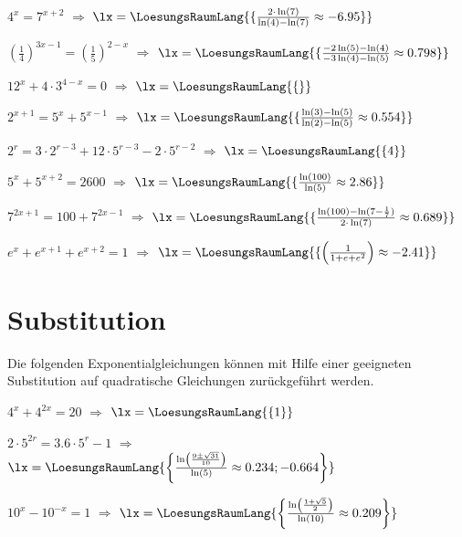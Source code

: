 \begin{bbwAufgabenBlock}
\item $4^x=7^{x+2}$ $\Longrightarrow$ $\lx=\LoesungsRaumLang{\{\frac{2\cdot{}\ln(7)}{\ln(4)-\ln(7)} \approx -6.95   \}}$ \plz{}
\item $\left(\frac14\right)^{3x-1} = \left(\frac15\right)^{2-x}$ $\Longrightarrow$ $\lx=\LoesungsRaumLang{\{\frac{-2\ln(5)-\ln(4)}{-3\ln(4)-\ln(5)} \approx 0.798   \}}$ \plz{}
\item $12^x+4\cdot{}3^{4-x}=0$ $\Longrightarrow$
$\lx=\LoesungsRaumLang{\{   \}}$  \plz{} \noTRAINER{\newpage}
\item $2^{x+1}=5^x + 5^{x-1}$ $\Longrightarrow$ $\lx=\LoesungsRaumLang{\{\frac{\ln(3)-\ln(5)}{\ln(2)-\ln(5)} \approx 0.554   \}}$ \plz{}
\item $2^r=3\cdot{}2^{r-3} + 12\cdot{}5^{r-3} - 2\cdot{}5^{r-2}$ $\Longrightarrow$ $\lx=\LoesungsRaumLang{\{ 4 \}}$ \plz{}
\item $5^x + 5^{x+2} = 2600$ $\Longrightarrow$ $\lx=\LoesungsRaumLang{\{\frac{\ln(100)}{\ln(5)} \approx 2.86   \}}$ \plz{}
\item $7^{2x+1} = 100 + 7^{2x-1}$ $\Longrightarrow$ $\lx=\LoesungsRaumLang{\{\frac{\ln(100) - \ln(7-\frac17)}{2\cdot{}\ln(7)} \approx  0.689  \}}$ \plz{}\noTRAINER{\newpage}
\item $e^x + e^{x+1} + e^{x+2} = 1$ $\Longrightarrow$ $\lx=\LoesungsRaumLang{\{\left(\frac{1}{1+e+e^2}\right) \approx -2.41  \}}$ \plz{}

\end{bbwAufgabenBlock}

\platzFuerBerechnungenBisEndeSeite{}

\section{Substitution}
Die folgenden Exponentialgleichungen können mit Hilfe einer geeigneten
Substitution auf quadratische Gleichungen zurückgeführt werden.

\begin{bbwAufgabenBlock}
\item $4^x + 4^{2x} = 20$ $\Longrightarrow$ $\lx=\LoesungsRaumLang{\{  1   \}}$ \plz{}
\item $2\cdot{}5^{2r} = 3.6\cdot{}5^r - 1$ $\Longrightarrow$
$\lx=\LoesungsRaumLang{\left\{   \frac{\ln\left(\frac{9\pm\sqrt{31}}{10}\right)}{\ln(5)} \approx
0.234; -0.664 \right\}
}$ \plz{}
\item $10^x - 10^{-x} = 1$ $\Longrightarrow$ $\lx=\LoesungsRaumLang{\left\{  \frac{\ln\left(\frac{1+\sqrt{5}}{2}\right)}{\ln(10)} \approx  0.209   \right\}}$ 

\end{bbwAufgabenBlock}
\platzFuerBerechnungenBisEndeSeite{}


